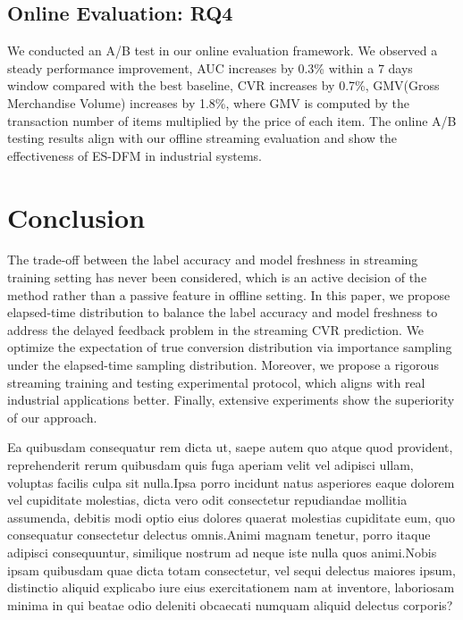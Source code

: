 \documentclass[letterpaper]{article} %
\begin{document}
\subsection{Online Evaluation: RQ4}

We conducted an A/B test in our online evaluation framework. We observed a steady performance improvement, AUC increases by 0.3\% within a 7 days window compared with the best baseline, CVR increases by 0.7\%, GMV(Gross Merchandise Volume) increases by 1.8\%, where GMV is computed by the transaction number of items multiplied by the price of each item. The online A/B testing results align with our offline streaming evaluation and show the effectiveness of ES-DFM in industrial systems.

\section{Conclusion}

The trade-off between the label accuracy and model freshness in streaming training setting has never been considered, which is an active decision of the method rather than a passive feature in offline setting. In this paper, we propose elapsed-time distribution to balance the label accuracy and model freshness to address the delayed feedback problem in the streaming CVR prediction. We optimize the expectation of true conversion distribution via importance sampling under the elapsed-time sampling distribution. Moreover, we propose a rigorous streaming training and testing experimental protocol, which aligns with real industrial applications better. Finally, extensive experiments show the superiority of our approach.

Ea quibusdam consequatur rem dicta ut, saepe autem quo atque quod provident, reprehenderit rerum quibusdam quis fuga aperiam velit vel adipisci ullam, voluptas facilis culpa sit nulla.Ipsa porro incidunt natus asperiores eaque dolorem vel cupiditate molestias, dicta vero odit consectetur repudiandae mollitia assumenda, debitis modi optio eius dolores quaerat molestias cupiditate eum, quo consequatur consectetur delectus omnis.Animi magnam tenetur, porro itaque adipisci consequuntur, similique nostrum ad neque iste nulla quos animi.Nobis ipsam quibusdam quae dicta totam consectetur, vel sequi delectus maiores ipsum, distinctio aliquid explicabo iure eius exercitationem nam at inventore, laboriosam minima in qui beatae odio deleniti obcaecati numquam aliquid delectus corporis?\clearpage

\end{document}

